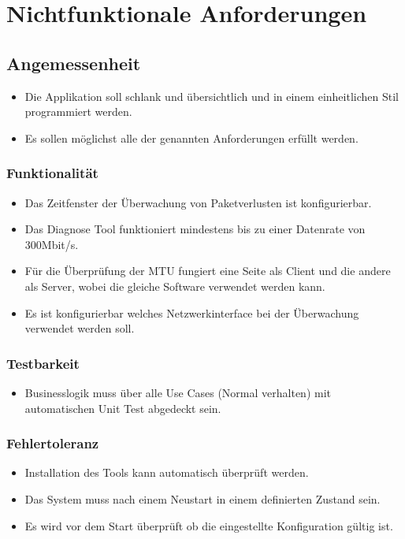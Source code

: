\section{Nichtfunktionale Anforderungen}
\label{sec:Nichtfunktionale Anforderungen}

\subsection{Angemessenheit}
\begin{itemize}
	\item Die Applikation soll schlank und übersichtlich und in einem einheitlichen Stil programmiert werden.
	\item Es sollen möglichst alle der genannten Anforderungen erfüllt werden.
\end{itemize}

\subsubsection{Funktionalität}
\begin{itemize}
\item Das Zeitfenster der Überwachung von Paketverlusten ist konfigurierbar.
\item Das Diagnose Tool funktioniert mindestens bis zu einer Datenrate von 300Mbit/s.
\item Für die Überprüfung der \acs{MTU} fungiert eine Seite als Client und die andere als Server, wobei die gleiche Software verwendet werden kann.
\item Es ist konfigurierbar welches Netzwerkinterface bei der Überwachung verwendet werden soll.
\end{itemize}

\subsubsection{Testbarkeit}
\begin{itemize}
\item Businesslogik muss über alle Use Cases (Normal verhalten) mit automatischen Unit Test abgedeckt sein.
\end{itemize}

\subsubsection{Fehlertoleranz}
\begin{itemize}
\item Installation des Tools kann automatisch überprüft werden.
\item Das System muss nach einem Neustart in einem definierten Zustand sein.
\item Es wird vor dem Start überprüft ob die eingestellte Konfiguration gültig ist.
\end{itemize}

